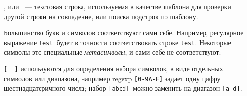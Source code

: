\label{regexp}

, или 
\ --- текстовая строка, используемая в качестве
шаблона для проверки другой строки на совпадение, или поиска подстрок по
шаблону.

Большинство букв и символов соответствуют сами себе. Например, регулярное 
выражение \verb|test|\ будет в точности соответствовать строке \verb|test|.
Некоторые символы это специальные \emph{метасимволы}, и сами себе не 
соответствуют:

\begin{description}
\item{\verb|[  ]|} используются для определения набора символов, в виде
отдельных символов или диапазона, например regexp \verb|[0-9A-F]| задает одну
цифру шестнадцатеричного числа; набор \verb|[abcd]|\ можно заменить на диапазон
\verb|[a-d]|. 
\end{description}